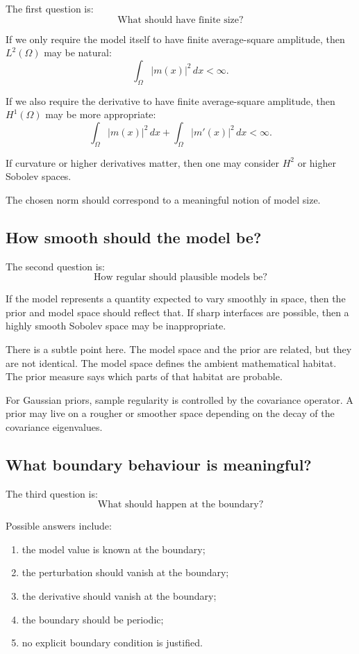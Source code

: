 \documentclass[11pt,a4paper]{book}
\begin{document}
The first question is:
\[
    \text{What should have finite size?}
\]

If we only require the model itself to have finite average-square amplitude,
then $L^2(\Omega)$ may be natural:
\[
    \int_\Omega |m(x)|^2\,dx < \infty.
\]

If we also require the derivative to have finite average-square amplitude, then
$H^1(\Omega)$ may be more appropriate:
\[
    \int_\Omega |m(x)|^2\,dx
    +
    \int_\Omega |m'(x)|^2\,dx
    <\infty.
\]

If curvature or higher derivatives matter, then one may consider $H^2$ or
higher Sobolev spaces.

The chosen norm should correspond to a meaningful notion of model size.

\subsection{How smooth should the model be?}

The second question is:
\[
    \text{How regular should plausible models be?}
\]

If the model represents a quantity expected to vary smoothly in space, then the
prior and model space should reflect that. If sharp interfaces are possible,
then a highly smooth Sobolev space may be inappropriate.

There is a subtle point here. The model space and the prior are related, but
they are not identical. The model space defines the ambient mathematical
habitat. The prior measure says which parts of that habitat are probable.

For Gaussian priors, sample regularity is controlled by the covariance
operator. A prior may live on a rougher or smoother space depending on the decay
of the covariance eigenvalues.

\subsection{What boundary behaviour is meaningful?}

The third question is:
\[
    \text{What should happen at the boundary?}
\]

Possible answers include:
\begin{enumerate}[label=\arabic*.]
    \item the model value is known at the boundary;
    \item the perturbation should vanish at the boundary;
    \item the derivative should vanish at the boundary;
    \item the boundary should be periodic;
    \item no explicit boundary condition is justified.
\end{enumerate}
\end{document}
